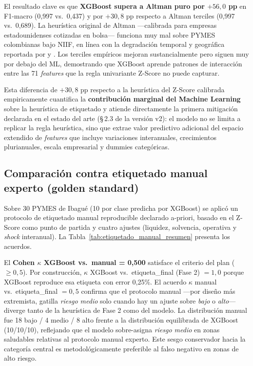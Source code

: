 \documentclass[12pt, letterpaper]{article}
\newcommand{\zaltscore}{Z\textquotesingle\textquotesingle-Score}
\begin{document}
El resultado clave es que \textbf{XGBoost supera a Altman puro por $+56{,}0$ pp} en F1-macro (0,997 vs.\ 0,437) y por $+30{,}8$ pp respecto a Altman terciles (0,997 vs.\ 0,689). La heur\'istica original de Altman ---calibrada para empresas estadounidenses cotizadas en bolsa--- funciona muy mal sobre PYMES colombianas bajo NIIF, en l\'inea con la degradaci\'on temporal y geogr\'afica reportada por \citet{Grice2003} y \citet{Bouwmeester2020}. Los terciles emp\'iricos mejoran sustancialmente pero siguen muy por debajo del ML, demostrando que XGBoost aprende patrones de interacci\'on entre las 71 \textit{features} que la regla univariante Z-Score no puede capturar.

Esta diferencia de $+30{,}8$ pp respecto a la heur\'istica del Z-Score calibrada empiricamente cuantifica la \textbf{contribuci\'on marginal del Machine Learning} sobre la heur\'istica de etiquetado y atiende directamente la primera mitigaci\'on declarada en el estado del arte (\S\,2.3 de la versi\'on v2): el modelo no se limita a replicar la regla heur\'istica, sino que extrae valor predictivo adicional del espacio extendido de \textit{features} que incluye variaciones interanuales, crecimientos plurianuales, escala empresarial y dummies categ\'oricas.

\subsection{Comparaci\'on contra etiquetado manual experto (golden standard)}
\label{sec:disc-manual}

Sobre 30 PYMES de Ibagu\'e (10 por clase predicha por XGBoost) se aplic\'o un protocolo de etiquetado manual reproducible declarado a-priori, basado en el \zaltscore{} como punto de partida y cuatro ajustes (liquidez, solvencia, operativa y \textit{shock} interanual). La Tabla~\ref{tab:etiquetado_manual_resumen} presenta los acuerdos.



El \textbf{Cohen $\kappa$ XGBoost vs.\ manual = 0{,}500} satisface el criterio del plan ($\geq 0{,}5$). Por construcci\'on, $\kappa$ XGBoost vs.\ etiqueta\_final (Fase 2) $= 1{,}0$ porque XGBoost reproduce esa etiqueta con error 0,25\%. El acuerdo $\kappa$ manual vs.\ etiqueta\_final $= 0{,}5$ confirma que el protocolo manual ---por dise\~no m\'as extremista, gatilla \textit{riesgo medio} solo cuando hay un ajuste sobre \textit{bajo} o \textit{alto}--- diverge tanto de la heur\'istica de Fase 2 como del modelo. La distribuci\'on manual fue 18 bajo / 4 medio / 8 alto frente a la distribuci\'on equilibrada de XGBoost (10/10/10), reflejando que el modelo sobre-asigna \textit{riesgo medio} en zonas saludables relativas al protocolo manual experto. Este sesgo conservador hacia la categor\'ia central es metodol\'ogicamente preferible al falso negativo en zonas de alto riesgo.
\end{document}
